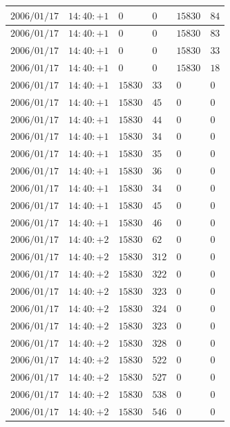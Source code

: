 \documentclass[a4j,papersize,disablejfam,slide,14pt]{jsarticle}
\begin{document}
\begin{description}
\begin{center}
\begin{longtable}{|l|l|l|l|l|l|}
					$2006/01/17$ & $14:40:+1$  & $0$ & $0$ & $15830$ & $84$ \\ \hline
					$2006/01/17$ & $14:40:+1$  & $0$ & $0$ & $15830$ & $83$ \\ \hline
					$2006/01/17$ & $14:40:+1$  & $0$ & $0$ & $15830$ & $33$ \\ \hline
					$2006/01/17$ & $14:40:+1$  & $0$ & $0$ & $15830$ & $18$ \\ \hline
					$2006/01/17$ & $14:40:+1$  & $15830$ & $33$ & $0$ & $0$ \\ \hline
					$2006/01/17$ & $14:40:+1$  & $15830$ & $45$ & $0$ & $0$ \\ \hline
					$2006/01/17$ & $14:40:+1$  & $15830$ & $44$ & $0$ & $0$ \\ \hline
					$2006/01/17$ & $14:40:+1$  & $15830$ & $34$ & $0$ & $0$ \\ \hline
					$2006/01/17$ & $14:40:+1$  & $15830$ & $35$ & $0$ & $0$ \\ \hline
					$2006/01/17$ & $14:40:+1$  & $15830$ & $36$ & $0$ & $0$ \\ \hline
					$2006/01/17$ & $14:40:+1$  & $15830$ & $34$ & $0$ & $0$ \\ \hline
					$2006/01/17$ & $14:40:+1$  & $15830$ & $45$ & $0$ & $0$ \\ \hline
					$2006/01/17$ & $14:40:+1$  & $15830$ & $46$ & $0$ & $0$ \\ \hline
					$2006/01/17$ & $14:40:+2$  & $15830$ & $62$ & $0$ & $0$ \\ \hline
					$2006/01/17$ & $14:40:+2$  & $15830$ & $312$ & $0$ & $0$ \\ \hline
					$2006/01/17$ & $14:40:+2$  & $15830$ & $322$ & $0$ & $0$ \\ \hline
					$2006/01/17$ & $14:40:+2$  & $15830$ & $323$ & $0$ & $0$ \\ \hline
					$2006/01/17$ & $14:40:+2$  & $15830$ & $324$ & $0$ & $0$ \\ \hline
					$2006/01/17$ & $14:40:+2$  & $15830$ & $323$ & $0$ & $0$ \\ \hline
					$2006/01/17$ & $14:40:+2$  & $15830$ & $328$ & $0$ & $0$ \\ \hline
					$2006/01/17$ & $14:40:+2$  & $15830$ & $522$ & $0$ & $0$ \\ \hline
					$2006/01/17$ & $14:40:+2$  & $15830$ & $527$ & $0$ & $0$ \\ \hline
					$2006/01/17$ & $14:40:+2$  & $15830$ & $538$ & $0$ & $0$ \\ \hline
					$2006/01/17$ & $14:40:+2$  & $15830$ & $546$ & $0$ & $0$ \\ \hline

\end{longtable}
\end{center}
\end{description}
\end{document}
